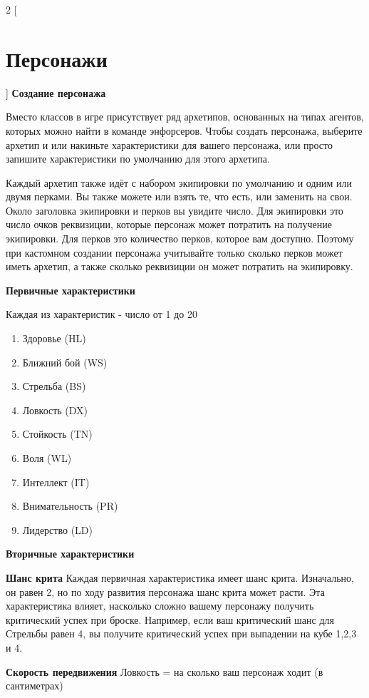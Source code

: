 \begin{multicols}{2}
[
\section{Персонажи}
]
\textbf{Создание персонажа}

Вместо классов в игре присутствует ряд архетипов, основанных на типах агентов, которых можно найти в команде 
энфорсеров. Чтобы создать персонажа, выберите архетип и или накиньте характеристики для вашего персонажа, 
или просто запишите характеристики по умолчанию для этого архетипа.

Каждый архетип также идёт с набором экипировки по умолчанию и одним или двумя перками. 
Вы также можете или взять те, что есть, или заменить на свои. Около заголовка экипировки 
и перков вы увидите число. Для экипировки это число очков реквизиции, которые персонаж может 
потратить на получение экипировки. Для перков это количество перков, которое вам доступно. 
Поэтому при кастомном создании персонажа учитывайте только сколько перков может иметь архетип, 
а также сколько реквизиции он может потратить на экипировку.

\textbf{Первичные характеристики}

Каждая из характеристик - число от 1 до 20

\begin{enumerate}
    \item Здоровье (HL)
    \item Ближний бой (WS)
    \item Стрельба (BS)
    \item Ловкость (DX)
    \item Стойкость (TN)
    \item Воля (WL)
    \item Интеллект (IT)
    \item Внимательность (PR)
    \item Лидерство (LD)
\end{enumerate}

\textbf{Вторичные характеристики}

\textbf{Шанс крита}
Каждая первичная характеристика имеет шанс крита. Изначально, он равен 2, но по ходу 
развития персонажа шанс крита может расти. Эта характеристика влияет, насколько сложно 
вашему персонажу получить критический успех при броске. Например, если ваш критический 
шанс для Стрельбы равен 4, вы получите критический успех при выпадении на кубе 1,2,3 и 4.

\textbf{Скорость передвижения}
Ловкость = на сколько ваш персонаж ходит (в сантиметрах)


\end{multicols}
